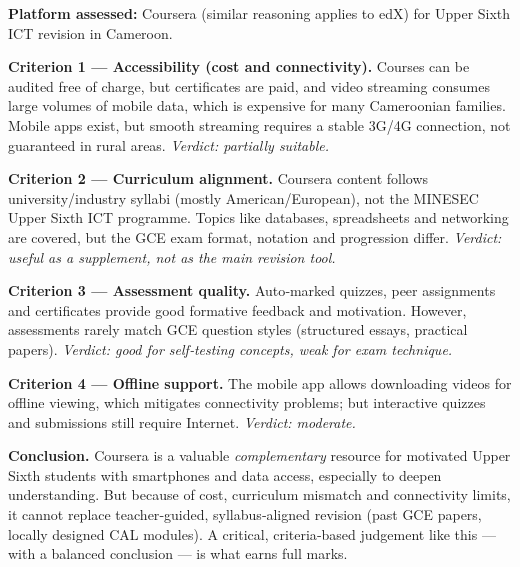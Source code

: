 \documentclass[11pt]{article}
\begin{document}
\begin{corrige}
\textbf{Platform assessed:} Coursera (similar reasoning applies to edX) for Upper Sixth ICT revision in Cameroon.

\textbf{Criterion 1 — Accessibility (cost and connectivity).} Courses can be audited free of charge, but certificates are paid, and video streaming consumes large volumes of mobile data, which is expensive for many Cameroonian families. Mobile apps exist, but smooth streaming requires a stable 3G/4G connection, not guaranteed in rural areas. \emph{Verdict: partially suitable.}

\textbf{Criterion 2 — Curriculum alignment.} Coursera content follows university/industry syllabi (mostly American/European), not the MINESEC Upper Sixth ICT programme. Topics like databases, spreadsheets and networking are covered, but the GCE exam format, notation and progression differ. \emph{Verdict: useful as a supplement, not as the main revision tool.}

\textbf{Criterion 3 — Assessment quality.} Auto‑marked quizzes, peer assignments and certificates provide good formative feedback and motivation. However, assessments rarely match GCE question styles (structured essays, practical papers). \emph{Verdict: good for self‑testing concepts, weak for exam technique.}

\textbf{Criterion 4 — Offline support.} The mobile app allows downloading videos for offline viewing, which mitigates connectivity problems; but interactive quizzes and submissions still require Internet. \emph{Verdict: moderate.}

\textbf{Conclusion.} Coursera is a valuable \emph{complementary} resource for motivated Upper Sixth students with smartphones and data access, especially to deepen understanding. But because of cost, curriculum mismatch and connectivity limits, it cannot replace teacher‑guided, syllabus‑aligned revision (past GCE papers, locally designed CAL modules). A critical, criteria‑based judgement like this — with a balanced conclusion — is what earns full marks.
\end{corrige}
\end{document}
